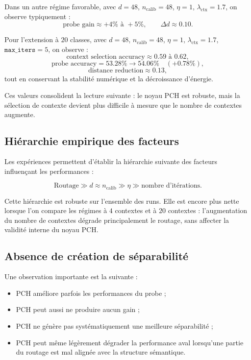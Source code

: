 \documentclass[11pt,a4paper]{article}
\newcommand{\1}{\mathbf 1}
\begin{document}
Dans un autre régime favorable, avec \(d=48\), \(n_{\mathrm{calib}}=48\), \(\eta=1\), \(\lambda_{\mathrm{ctx}}=1.7\), on observe typiquement :
\[
\text{probe gain}\approx +4\% \text{ à } +5\%,
\qquad
\Delta d \approx 0.10.
\]

Pour l’extension à \(20\) classes, avec \(d=48\), \(n_{\mathrm{calib}}=48\), \(\eta=1\), \(\lambda_{\mathrm{ctx}}=1.7\), \(\texttt{max\_iters}=5\), on observe :
\[
\text{context selection accuracy}\approx 0.59 \text{ à } 0.62,
\]
\[
\text{probe accuracy}
=
53.28\%
\rightarrow
54.06\%
\quad
(+0.78\%),
\]
\[
\text{distance reduction}\approx 0.13,
\]
tout en conservant la stabilité numérique et la décroissance d’énergie.

Ces valeurs consolident la lecture suivante : le noyau PCH est robuste, mais la sélection de contexte devient plus difficile à mesure que le nombre de contextes augmente.

\subsection{Hiérarchie empirique des facteurs}

Les expériences permettent d’établir la hiérarchie suivante des facteurs influençant les performances :

\[
\text{Routage}
\gg
d
\approx
n_{\mathrm{calib}}
\gg
\eta
\gg
\text{nombre d’itérations}.
\]

Cette hiérarchie est robuste sur l’ensemble des runs. Elle est encore plus nette lorsque l’on compare les régimes à \(4\) contextes et à \(20\) contextes : l’augmentation du nombre de contextes dégrade principalement le routage, sans affecter la validité interne du noyau PCH.

\subsection{Absence de création de séparabilité}

Une observation importante est la suivante :

\begin{itemize}[leftmargin=2em]
\item PCH améliore parfois les performances du probe ;
\item PCH peut aussi ne produire aucun gain ;
\item PCH ne génère pas systématiquement une meilleure séparabilité ;
\item PCH peut même légèrement dégrader la performance aval lorsqu’une partie du routage est mal alignée avec la structure sémantique.
\end{itemize}
\end{document}
